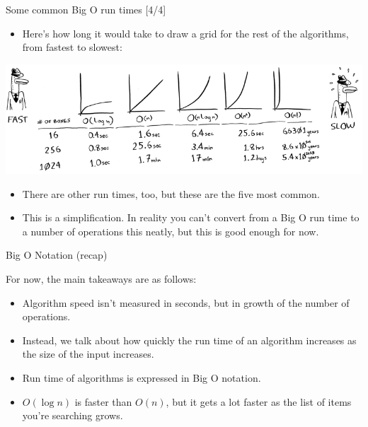 \documentclass[ignorenonframetext,]{beamer}
\providecommand{\tightlist}{%
  \setlength{\itemsep}{0pt}\setlength{\parskip}{0pt}}
\begin{document}
\begin{frame}{Some common Big O run times {[}4/4{]}}
\protect\hypertarget{some-common-big-o-run-times-44}{}

\begin{itemize}
\tightlist
\item
  Here's how long it would take to draw a grid for the rest of the
  algorithms, from fastest to slowest:
\end{itemize}

\includegraphics{./Chapter01-figure/big_o_fast_to_slow.png}

\begin{itemize}
\tightlist
\item
  There are other run times, too, but these are the five most common.
\item
  This is a simplification. In reality you can't convert from a Big O
  run time to a number of operations this neatly, but this is good
  enough for now.
\end{itemize}

\end{frame}

\begin{frame}{Big O Notation (recap)}
\protect\hypertarget{big-o-notation-recap}{}

For now, the main takeaways are as follows:

\begin{itemize}
\tightlist
\item
  Algorithm speed isn't measured in seconds, but in growth of the number
  of operations.
\item
  Instead, we talk about how quickly the run time of an algorithm
  increases as the size of the input increases.
\item
  Run time of algorithms is expressed in Big O notation.
\item
  \(O(\log n)\) is faster than \(O(n)\), but it gets a lot faster as the
  list of items you're searching grows.
\end{itemize}

\end{frame}
\end{document}
